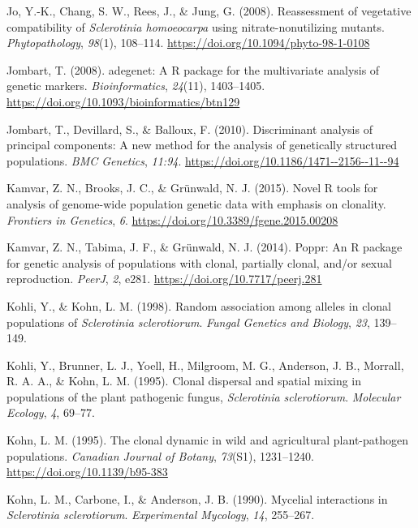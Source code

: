 \documentclass[fleqn,10pt,lineno]{wlpeerj} %
\theoremstyle{definition}
\theoremstyle{definition}
\theoremstyle{definition}
\theoremstyle{remark}
\begin{document}
\hypertarget{ref-jo2008reassessment}{}
Jo, Y.-K., Chang, S. W., Rees, J., \& Jung, G. (2008). Reassessment of
vegetative compatibility of \emph{Sclerotinia homoeocarpa} using
nitrate-nonutilizing mutants. \emph{Phytopathology}, \emph{98}(1),
108--114. \url{https://doi.org/10.1094/phyto-98-1-0108}

\hypertarget{ref-jombart2008adegenet}{}
Jombart, T. (2008). adegenet: A R package for the multivariate analysis
of genetic markers. \emph{Bioinformatics}, \emph{24}(11), 1403--1405.
\url{https://doi.org/10.1093/bioinformatics/btn129}

\hypertarget{ref-jombart2010discriminant}{}
Jombart, T., Devillard, S., \& Balloux, F. (2010). Discriminant analysis
of principal components: A new method for the analysis of genetically
structured populations. \emph{BMC Genetics}, \emph{11:94}.
\url{https://doi.org/10.1186/1471--2156--11--94}

\hypertarget{ref-kamvar2015novel}{}
Kamvar, Z. N., Brooks, J. C., \& Grünwald, N. J. (2015). Novel R tools
for analysis of genome-wide population genetic data with emphasis on
clonality. \emph{Frontiers in Genetics}, \emph{6}.
\url{https://doi.org/10.3389/fgene.2015.00208}

\hypertarget{ref-kamvar2014poppr}{}
Kamvar, Z. N., Tabima, J. F., \& Grünwald, N. J. (2014). Poppr: An R
package for genetic analysis of populations with clonal, partially
clonal, and/or sexual reproduction. \emph{PeerJ}, \emph{2}, e281.
\url{https://doi.org/10.7717/peerj.281}

\hypertarget{ref-kohli1998random}{}
Kohli, Y., \& Kohn, L. M. (1998). Random association among alleles in
clonal populations of \emph{Sclerotinia sclerotiorum}. \emph{Fungal
Genetics and Biology}, \emph{23}, 139--149.

\hypertarget{ref-kohli1995clonal}{}
Kohli, Y., Brunner, L. J., Yoell, H., Milgroom, M. G., Anderson, J. B.,
Morrall, R. A. A., \& Kohn, L. M. (1995). Clonal dispersal and spatial
mixing in populations of the plant pathogenic fungus, \emph{Sclerotinia
sclerotiorum}. \emph{Molecular Ecology}, \emph{4}, 69--77.

\hypertarget{ref-kohn1995clonal}{}
Kohn, L. M. (1995). The clonal dynamic in wild and agricultural
plant-pathogen populations. \emph{Canadian Journal of Botany},
\emph{73}(S1), 1231--1240. \url{https://doi.org/10.1139/b95-383}

\hypertarget{ref-kohn1990mycelial}{}
Kohn, L. M., Carbone, I., \& Anderson, J. B. (1990). Mycelial
interactions in \emph{Sclerotinia sclerotiorum}. \emph{Experimental
Mycology}, \emph{14}, 255--267.
\end{document}
